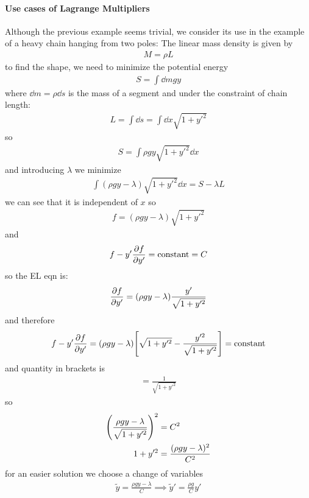 \documentclass[../main.tex]{subfiles}
\begin{document}
\paragraph*{Use cases of Lagrange Multipliers} Although the previous example seems trivial, we 
consider its use in the example of a heavy chain hanging from two poles: The linear mass density is
given by
\begin{align*}
    M = \rho L
\end{align*}
to find the shape, we need to minimize the potential energy
\begin{align*}
    S = \int \dd m g y
\end{align*}
where $\dd m = \rho \dd s$ is the mass of a segment and under the constraint of chain length:
\begin{align*}
    L = \int \dd s = \int \dd x \sqrt{1 + y'^2} 
\end{align*}
so
\begin{align*}
    S = \int \rho gy \sqrt{1 + y'^2} \dd x
\end{align*}
and introducing $\lambda$ we minimize
\begin{align*}
    \int (\rho g y - \lambda) \sqrt{1 + y'^2} \dd x = S - \lambda L
\end{align*}
we can see that it is independent of $x$ so
\begin{align*}
    f = (\rho g y - \lambda) \sqrt{1 + y'^2}
\end{align*}
and
\begin{align*}
    f - y' \pdv{f}{y'} = \text{constant} = C
\end{align*}
so the EL eqn is:
\begin{align*}
    \pdv{f}{y'} = (\rho g y - \lambda) \frac{y'}{\sqrt{1 + y'^2}}
\end{align*}
and therefore
\begin{align*}
    f - y' \pdv{f}{y'} = (\rho g y - \lambda)
        \qt[\sqrt{1 + y'^2} - \frac{y'^2}{\sqrt{1 + y'^2}}] = \text{constant}
\end{align*}
and quantity in brackets is
\begin{align*}
    [\;] = \frac{1}{\sqrt{1 + y'^2}}
\end{align*}
so
\begin{align*}
    \qt(\frac{\rho g y - \lambda}{\sqrt{1 + y'^2}})^2 &= C^2 \\
    1 + y'^2 &= \frac{(\rho g y - \lambda)^2}{C^2}
\end{align*}
for an easier solution we choose a change of variables
\begin{align*}
    \tilde y = \frac{\rho g y - \lambda}{C} \implies \tilde y' = \frac{\rho g}{C} y'
\end{align*}
\end{document}
